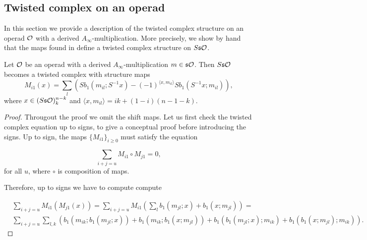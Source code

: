 \documentclass[twoside]{article}
\begin{document}
\begin{appendices}
\appendix
\gdef\thesection{Appendix \Alph{section}}
\section{Twisted complex on an operad}\label{twistedoperad}
In this section we provide a description of the twisted complex structure on an operad ${\mathcal O}$ with a derived $A_\infty$-multiplication. More precisely, we show by hand that the maps found in  define a twisted complex structure on $S\mathfrak{s}{\mathcal O}$.

\begin{lem}\label{twistedmaps}
Let ${\mathcal O}$ be an operad with a derived $A_\infty$-multiplication $m\in\mathfrak{s}{\mathcal O}$. Then $S\mathfrak{s}{\mathcal O}$ becomes a twisted complex with structure maps
\[M_{i1}(x)= \sum_l (Sb_1(m_{il};S^{-1}x)-(-1)^{\langle x,m_{il}\rangle}Sb_1(S^{-1}x;m_{il})),\]
where $x\in (S\mathfrak{s}{\mathcal O})^{n-k}_k$ and $\langle x,m_{il}\rangle=ik+(1-i)(n-1-k)$.
\end{lem}
\begin{proof}


Througout the proof we omit the shift maps. Let us first check the twisted complex equation up to signs, to give a conceptual proof before introducing the signs. Up to sign, the maps  $\{M_{i1}\}_{i\geq 0}$ must satisfy the equation

\[\sum_{i+j=u} M_{i1}\circ M_{j1}=0,\]
for all $u$, where $\circ$ is composition of maps. %

Therefore, up to signs we have to compute compute 

\begin{align*}
&\sum_{i+j=u}M_{i1}(M_{j1}(x))=\sum_{i+j=u}M_{i1}\left(\sum_l b_1(m_{jl};x)+b_1(x;m_{jl})\right)=\\
&\sum_{i+j=u}\sum_{l,k}\left(b_1(m_{ik}; b_1(m_{jl};x))+b_1(m_{ik};b_1(x;m_{jl}))+b_1(b_1(m_{jl};x);m_{ik})+b_1(b_1(x;m_{jl});m_{ik})\right).
\end{align*}

%


\end{proof}
\end{appendices}
\end{document}
